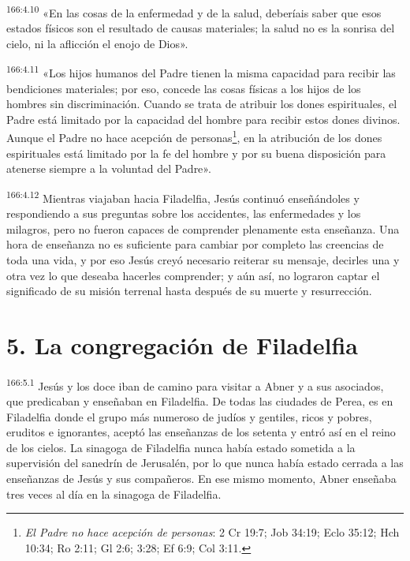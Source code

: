 \par
\textsuperscript{166:4.10} «En las cosas de la enfermedad y de la salud, deberíais saber que esos estados físicos son el resultado de causas materiales; la salud no es la sonrisa del cielo, ni la aflicción el enojo de Dios».

\par
\textsuperscript{166:4.11} «Los hijos humanos del Padre tienen la misma capacidad para recibir las bendiciones materiales; por eso, concede las cosas físicas a los hijos de los hombres sin discriminación. Cuando se trata de atribuir los dones espirituales, el Padre está limitado por la capacidad del hombre para recibir estos dones divinos. Aunque el Padre no hace acepción de personas\footnote{\textit{El Padre no hace acepción de personas}: 2 Cr 19:7; Job 34:19; Eclo 35:12; Hch 10:34; Ro 2:11; Gl 2:6; 3:28; Ef 6:9; Col 3:11.}, en la atribución de los dones espirituales está limitado por la fe del hombre y por su buena disposición para atenerse siempre a la voluntad del Padre».

\par
\textsuperscript{166:4.12} Mientras viajaban hacia Filadelfia, Jesús continuó enseñándoles y respondiendo a sus preguntas sobre los accidentes, las enfermedades y los milagros, pero no fueron capaces de comprender plenamente esta enseñanza. Una hora de enseñanza no es suficiente para cambiar por completo las creencias de toda una vida, y por eso Jesús creyó necesario reiterar su mensaje, decirles una y otra vez lo que deseaba hacerles comprender; y aún así, no lograron captar el significado de su misión terrenal hasta después de su muerte y resurrección.

\section*{5. La congregación de Filadelfia}
\par
\textsuperscript{166:5.1} Jesús y los doce iban de camino para visitar a Abner y a sus asociados, que predicaban y enseñaban en Filadelfia. De todas las ciudades de Perea, es en Filadelfia donde el grupo más numeroso de judíos y gentiles, ricos y pobres, eruditos e ignorantes, aceptó las enseñanzas de los setenta y entró así en el reino de los cielos. La sinagoga de Filadelfia nunca había estado sometida a la supervisión del sanedrín de Jerusalén, por lo que nunca había estado cerrada a las enseñanzas de Jesús y sus compañeros. En ese mismo momento, Abner enseñaba tres veces al día en la sinagoga de Filadelfia.

